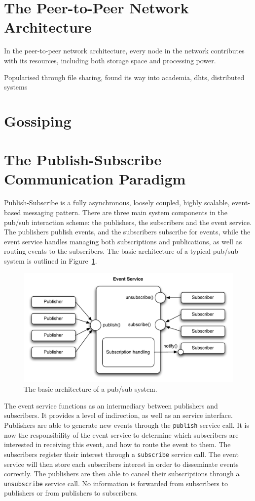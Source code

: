 \section{The Peer-to-Peer Network Architecture}
In the peer-to-peer network architecture, every node in the network
contributes with its resources, including both storage space and
processing power.

Popularised through file sharing, found its way into academia, dhts,
distributed systems

\section{Gossiping}

\section{The Publish-Subscribe Communication Paradigm}

Publish-Subscribe is a fully asynchronous, loosely coupled,
highly scalable, event-based messaging pattern. There are three main
system components in the pub/sub interaction scheme: the publishers, the
subscribers and the event service. The publishers publish events, and
the subscribers subscribe for events, while the event service handles
managing both subscriptions and publications, as well as routing events
to the subscribers. The basic architecture of a typical pub/sub system
is outlined in Figure~\ref{fig:pubsubarch}.

\begin{figure}
\centering
\includegraphics[width=\textwidth]{figures/pubsubarch}
\caption{The basic architecture of a pub/sub system.}
\label{fig:pubsubarch}
\end{figure}

The event service functions as an intermediary between publishers and
subscribers. It provides a level of indirection, as well as an service
interface. Publishers are able to generate new events through the
\texttt{publish} service call. It is now the responsibility of the event
service to determine which subscribers are interested in receiving this
event, and how to route the event to them. The subscribers register
their interest through a \texttt{subscribe} service call. The event
service will then store each subscribers interest in order to
disseminate events correctly. The publishers are then able to cancel
their subscriptions through a \texttt{unsubscribe} service call. No
information is forwarded from subscribers to publishers or from
publishers to subscribers.

